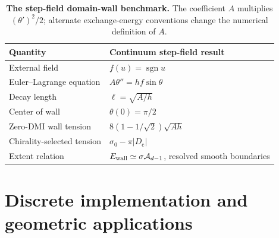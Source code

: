 \documentclass[11pt,a4paper]{article}
\begin{document}
\begin{table}[t]
\centering\caption{\textbf{The step-field domain-wall benchmark.} The coefficient \(A\) multiplies \((\theta')^2/2\); alternate exchange-energy conventions change the numerical definition of \(A\).}\label{tab:wall}
\small\begin{tabularx}{\linewidth}{@{}p{.34\linewidth}X@{}}\toprule
Quantity & Continuum step-field result\\\midrule
External field & \(f(u)=\operatorname{sgn}u\)\\
Euler--Lagrange equation & \(A\theta''=hf\sin\theta\)\\
Decay length & \(\ell=\sqrt{A/h}\)\\
Center of wall & \(\theta(0)=\pi/2\)\\
Zero-DMI wall tension & \(8(1-1/\sqrt2)\sqrt{Ah}\)\\
Chirality-selected tension & \(\sigma_0-\pi|D_{\mathrm c}|\)\\
Extent relation & \(E_{\rm wall}\simeq\sigma\mathcal A_{d-1}\), resolved smooth boundaries\\\bottomrule
\end{tabularx}\end{table}

\FloatBarrier
\section{Discrete implementation and geometric applications}\label{sec:implementation}
\end{document}
